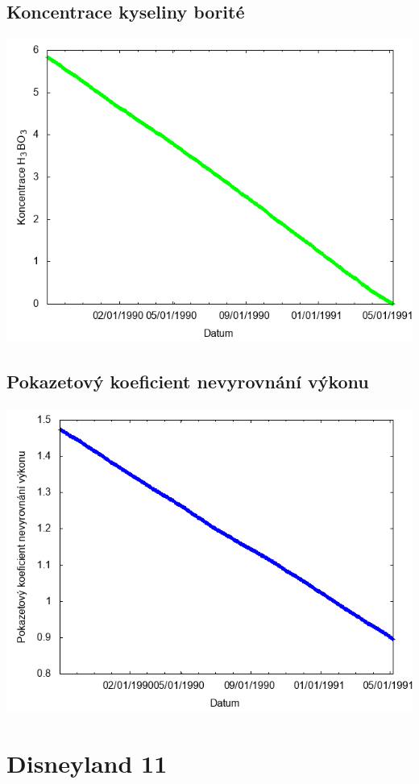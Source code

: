 \documentclass[a4paper,twoside,11pt]{article}
\begin{document}
\subsection*{Koncentrace kyseliny borité}
\begin{center}
\includegraphics[width=.8\textwidth]{graphs/Disneyland_10_bc.png}
\end{center}

\subsection*{Pokazetový koeficient nevyrovnání výkonu}
\begin{center}
\includegraphics[width=.8\textwidth]{graphs/Disneyland_10_fha.png}
\end{center}

\newpage
\section*{Disneyland 11}
\end{document}
